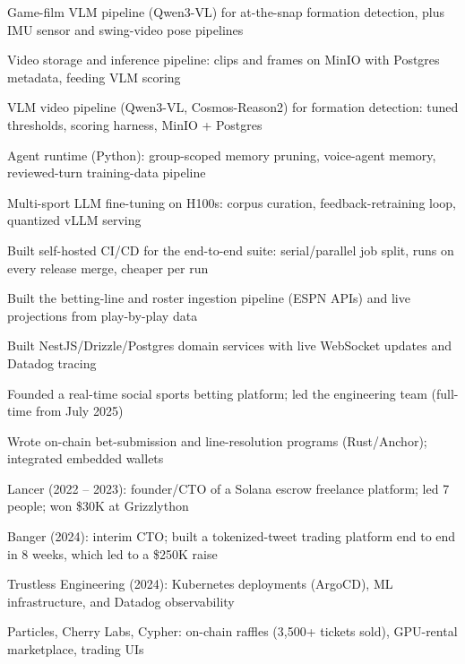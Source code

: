 \documentclass[print]{jack-resume}
\begin{document}
\begin{tightemize}
    \item Game-film VLM pipeline (Qwen3-VL) for at-the-snap formation detection, plus IMU sensor and swing-video pose pipelines
    \item Video storage and inference pipeline: clips and frames on MinIO with Postgres metadata, feeding VLM scoring
    \item VLM video pipeline (Qwen3-VL, Cosmos-Reason2) for formation detection: tuned thresholds, scoring harness, MinIO + Postgres
    \item Agent runtime (Python): group-scoped memory pruning, voice-agent memory, reviewed-turn training-data pipeline
    \item Multi-sport LLM fine-tuning on H100s: corpus curation, feedback-retraining loop, quantized vLLM serving
    \item Built self-hosted CI/CD for the end-to-end suite: serial/parallel job split, runs on every release merge, cheaper per run
\end{tightemize}
\sectionsep

\begin{tightemize}
    \item Built the betting-line and roster ingestion pipeline (ESPN APIs) and live projections from play-by-play data
    \item Built NestJS/Drizzle/Postgres domain services with live WebSocket updates and Datadog tracing
    \item Founded a real-time social sports betting platform; led the engineering team (full-time from July 2025)
    \item Wrote on-chain bet-submission and line-resolution programs (Rust/Anchor); integrated embedded wallets
\end{tightemize}
\sectionsep

\begin{tightemize}
    \item Lancer (2022 – 2023): founder/CTO of a Solana escrow freelance platform; led 7 people; won \$30K at Grizzlython
    \item Banger (2024): interim CTO; built a tokenized-tweet trading platform end to end in 8 weeks, which led to a \$250K raise
    \item Trustless Engineering (2024): Kubernetes deployments (ArgoCD), ML infrastructure, and Datadog observability
    \item Particles, Cherry Labs, Cypher: on-chain raffles (3,500+ tickets sold), GPU-rental marketplace, trading UIs
\end{tightemize}
\sectionsep
\end{document}
